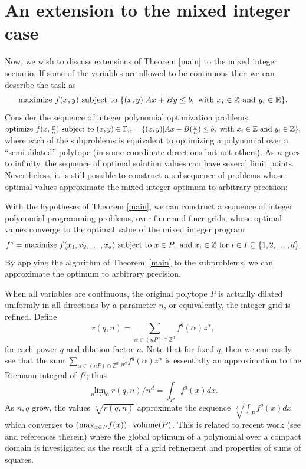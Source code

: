 \documentclass[twoside]{article}
\newcommand{\R}{\mathbb R}
\newcommand{\Z}{\mathbb Z}
\newcommand{\1}{{\bf 1}}
\begin{document}
\section{An extension to the mixed integer case}
Now, we wish to discuss extensions of Theorem \ref{main} to the
mixed integer scenario. If some of the variables are allowed to be
continuous then we can describe the task as
$$
\hbox{maximize} \ f(x,y) \ \hbox{subject to} \ \{ (x,y) | Ax+By \leq
b, \ \hbox{with} \ x_i \in \Z \ \hbox{and} \ y_i \in \R\}.
$$
Consider the sequence of integer polynomial optimization problems
$\hbox{optimize} \ f(x,\frac{y}{n}) \ \hbox{subject to}\ (x,y) \in
\Gamma_n=\{ (x,y) | Ax+B(\frac{y}{n}) \leq b, \ \hbox{with} \ x_i \in
\Z \ \hbox{and} \ y_i \in \Z \},$ where each of the subproblems is
equivalent to optimizing a polynomial over a ``semi-dilated'' polytope
(in some coordinate directions but not others). As $n$ goes to
infinity, the sequence of optimal solution values can
have several limit points.  Nevertheless, it is still possible 
to construct a subsequence 
of problems whose optimal values approximate the mixed integer optimum 
to arbitrary precision:

\begin{corollary} \label{mip} With the hypotheses of Theorem
  \ref{main}, 
  we can construct a sequence of integer polynomial programming problems, over
  finer and finer grids, whose optimal values converge
  to the optimal value of the mixed integer program
  \begin{displaymath}
    f^*=\hbox{maximize} \  f(x_1,x_2,\dots,x_d) \ \hbox{subject to} \ x \in P, \ \hbox{and} \ x_i \in \Z \
    \hbox{for} \ i \in I \subseteq  \{1,2,\dots,d\}.
  \end{displaymath}
  By applying the algorithm of Theorem~\ref{main} to the subproblems, we can approximate the
  optimum to arbitrary precision.
\end{corollary}

When all variables are continuous, the original
polytope $P$ is actually dilated uniformly in all directions by a
parameter $n$, or equivalently, the integer grid is refined. Define
$$ 
r(q,n)=\sum_{\alpha \in (nP) \cap \Z^d} f^q(\alpha) z^\alpha,
$$
for each power $q$ and dilation factor $n$. Note that for fixed
$q$, then we can easily see that the sum $\sum_{\alpha \in (nP) \cap
  \Z^d} \frac{1}{n^d} f^q(\alpha) z^\alpha$ is essentially an
approximation to the Riemann integral of $f^q$; thus
$$ 
\lim_{n \rightarrow \infty} r(q,n)/n^d = \int_P f^q(\bar{x})
d\bar{x}.
$$ 
As $n,q$ grow, the values $\sqrt[q]{r(q,n)}$ approximate the sequence
$\sqrt[q]{\int_P f^q(\bar{x}) d\bar{x}}$ which converges to
$(\hbox{max}_{x \in P} f(x))\cdot \hbox{volume} (P)$.  This is related
to recent work (see \cite{deklerketal,lasserre,parrilosturmfels} and
references therein) where the global optimum of a polynomial over a
compact domain is investigated as the result of a grid refinement and
properties of sums of squares.
\end{document}
